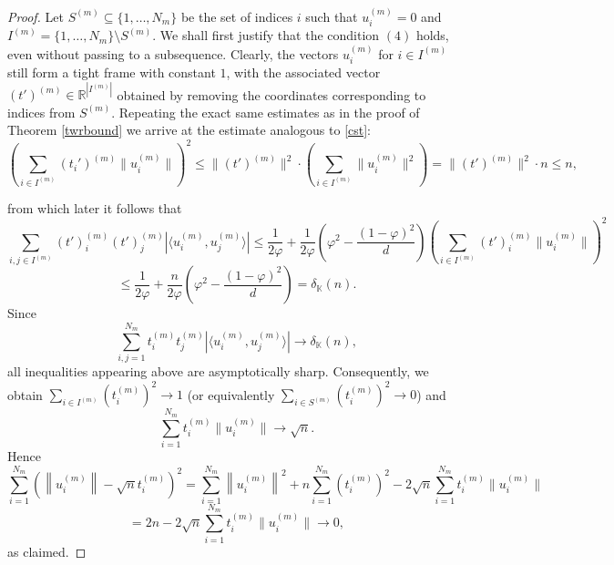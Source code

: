 \documentclass[12pt, reqno]{amsart}
\theoremstyle{definition}
\theoremstyle{remark}
\numberwithin{equation}{section}
\begin{document}
\begin{proof}
Let $S^{(m)} \subseteq \{1, \ldots, N_m\}$ be the set of indices $i$ such that $u^{(m)}_i=0$ and $I^{(m)}=\{1, \ldots, N_m\} \setminus S^{(m)}$. We shall first justify that the condition $(4)$ holds, even without passing to a subsequence. Clearly, the vectors $u^{(m)}_i$ for $i \in I^{(m)}$ still form a tight frame with constant $1$, with the associated vector $(t')^{(m)} \in \mathbb{R}^{|I^{(m)}|}$ obtained by removing the coordinates corresponding to indices from $S^{(m)}$. Repeating the exact same estimates as in the proof of Theorem \ref{twrbound} we arrive at the estimate analogous to \eqref{cst}:
$$\left( \sum_{i \in I^{(m)}} (t_i')^{(m)} \|u^{(m)}_i\| \right)^2 \leq \|(t')^{(m)}\|^2 \cdot \left ( \sum_{i \in I^{(m)}} \|u^{(m)}_i\|^2 \right ) = \|(t')^{(m)}\|^2 \cdot n \leq n,$$

from which later it follows that 
$$\sum_{i, j \in I^{(m)}} (t')^{(m)}_i (t')^{(m)}_j |\langle u^{(m)}_i, u^{(m)}_j \rangle| \leq \frac{1}{2\varphi} + \frac{1}{2 \varphi} \left ( \varphi^2 - \frac{(1-\varphi)^2}{d} \right) \left( \sum_{i \in I^{(m)}} (t')^{(m)}_i \|u^{(m)}_i\| \right)^2$$
$$\leq \frac{1}{2 \varphi} + \frac{n}{2 \varphi} \left ( \varphi^2 - \frac{(1-\varphi)^2}{d} \right) = \delta_{\mathbb{K}}(n).$$
Since 
$$ \sum_{i,j=1}^{N_m} t_i^{(m)}t_j^{(m)} |\langle u_i^{(m)},u_j^{(m)}\rangle| \to\delta_{\mathbb K}(n),$$
all inequalities appearing above are asymptotically sharp. Consequently, we obtain $\sum_{i \in I^{(m)}} \left (t^{(m)}_i \right )^2 \to 1$ (or equivalently $\sum_{i \in S^{(m)}} \left ( t^{(m)}_i \right )^2 \to 0$) and 
$$ \sum_{i=1}^{N_m} t^{(m)}_i \|u^{(m)}_i\|  \to \sqrt{n}.$$
Hence
$$\sum_{i=1}^{N_m} \left ( \left \| u_i^{(m)} \right  \| - \sqrt{n}t_i^{(m)} \right )^2 = \sum_{i=1}^{N_m} \left \| u_i^{(m)} \right  \|^2 + n \sum_{i=1}^{N_m} \left ( t_i^{(m)} \right  )^2  - 2 \sqrt{n}\sum_{i=1}^{N_m} t^{(m)}_i \|u^{(m)}_i\|$$
$$=2n - 2\sqrt{n} \sum_{i=1}^{N_m} t^{(m)}_i \|u^{(m)}_i\| \to 0,$$
as claimed.



\end{proof}
\end{document}
